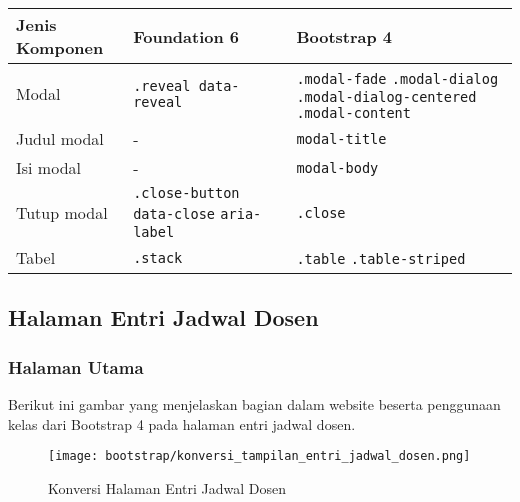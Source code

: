 \begin{tabular}{| p{} | p{} | p{} |} 
	\hline
	\textbf{Jenis Komponen} & \textbf{Foundation 6} & \textbf{Bootstrap 4}  \\ [0.5ex] 
	\hline	
	Modal & \texttt{.reveal data-reveal} & \texttt{.modal-fade} \newline \texttt{.modal-dialog} \newline \texttt{.modal-dialog-centered} \newline \texttt{.modal-content} \\
	\hline
	Judul modal & - & \texttt{modal-title}\\
	\hline
	Isi modal & - & \texttt{modal-body}\\
	\hline
	Tutup modal & \texttt{.close-button} \newline \texttt{data-close} \newline \texttt{aria-label} & \texttt{.close}\\
	\hline	
	Tabel & \texttt{.stack} & \texttt{.table} \newline \texttt{.table-striped} \\[1ex]
	\hline
\end{tabular}

\subsection{Halaman Entri Jadwal Dosen}
\subsubsection{Halaman Utama}
\noindent Berikut ini gambar yang menjelaskan bagian dalam website beserta penggunaan kelas dari Bootstrap 4 pada halaman entri jadwal dosen.\\
\begin{figure} [H]
	\centering  
	\texttt{[image: bootstrap/konversi\_tampilan\_entri\_jadwal\_dosen.png]}
	\caption{Konversi Halaman Entri Jadwal Dosen}
\end{figure}

